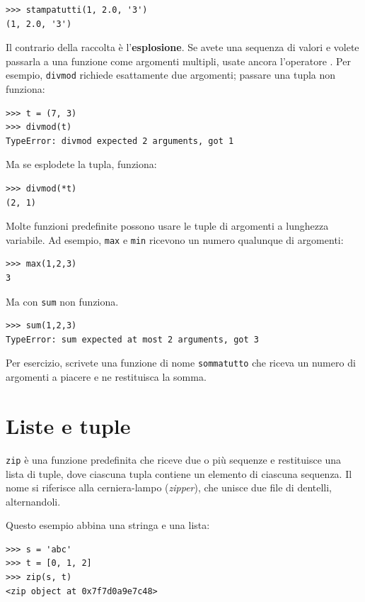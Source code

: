 \documentclass[10pt]{book}
\begin{document}
\begin{verbatim}
>>> stampatutti(1, 2.0, '3')
(1, 2.0, '3')
\end{verbatim}
%
Il contrario della raccolta è l'{\bf esplosione}.  Se avete una sequenza di valori e volete passarla a una funzione come argomenti multipli, usate ancora
 l'operatore {\tt *}. Per esempio, {\tt divmod} richiede esattamente due argomenti; passare una tupla non funziona:

\begin{verbatim}
>>> t = (7, 3)
>>> divmod(t)
TypeError: divmod expected 2 arguments, got 1
\end{verbatim}
%
Ma se esplodete la tupla, funziona:

\begin{verbatim}
>>> divmod(*t)
(2, 1)
\end{verbatim}
%


Molte funzioni predefinite possono usare le tuple di argomenti a lunghezza variabile. Ad esempio, {\tt max} e {\tt min} ricevono un numero qualunque di argomenti:

\begin{verbatim}
>>> max(1,2,3)
3
\end{verbatim}
%
Ma con {\tt sum} non funziona.

\begin{verbatim}
>>> sum(1,2,3)
TypeError: sum expected at most 2 arguments, got 3
\end{verbatim}
%
Per esercizio, scrivete una funzione di nome {\tt sommatutto} che riceva un numero di argomenti a piacere e ne restituisca la somma.


\section{Liste e tuple}

{\tt zip} è una funzione predefinita che riceve due o più sequenze e restituisce una lista di tuple, dove ciascuna tupla contiene un elemento di ciascuna sequenza.  Il nome si riferisce alla cerniera-lampo ({\em zipper}), che unisce due file di dentelli, alternandoli.

Questo esempio abbina una stringa e una lista:

\begin{verbatim}
>>> s = 'abc'
>>> t = [0, 1, 2]
>>> zip(s, t)
<zip object at 0x7f7d0a9e7c48>
\end{verbatim}
%
\end{document}
